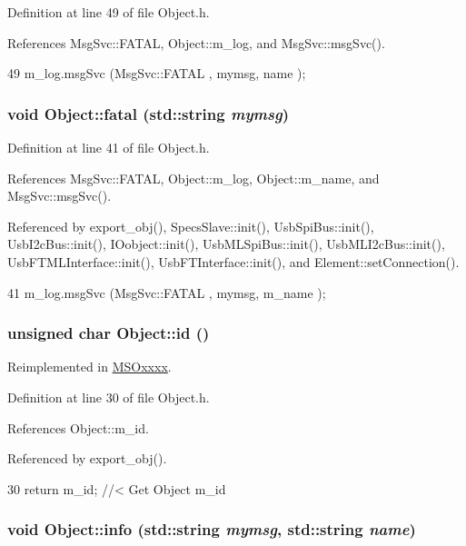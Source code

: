 Definition at line 49 of file Object.h.

References MsgSvc::FATAL, Object::m\_\-log, and MsgSvc::msgSvc().


\begin{DoxyCode}
49 { m_log.msgSvc (MsgSvc::FATAL   , mymsg, name ); }
\end{DoxyCode}
\hypertarget{classObject_aad5a16aac7516ce65bd5ec02ab07fc80}{
\subsubsection[{fatal}]{\setlength{\rightskip}{0pt plus 5cm}void Object::fatal (std::string {\em mymsg})}}
\label{classObject_aad5a16aac7516ce65bd5ec02ab07fc80}


Definition at line 41 of file Object.h.

References MsgSvc::FATAL, Object::m\_\-log, Object::m\_\-name, and MsgSvc::msgSvc().

Referenced by export\_\-obj(), SpecsSlave::init(), UsbSpiBus::init(), UsbI2cBus::init(), IOobject::init(), UsbMLSpiBus::init(), UsbMLI2cBus::init(), UsbFTMLInterface::init(), UsbFTInterface::init(), and Element::setConnection().


\begin{DoxyCode}
41 { m_log.msgSvc (MsgSvc::FATAL   , mymsg, m_name ); }
\end{DoxyCode}
\hypertarget{classObject_af99145335cc61ff6e2798ea17db009d2}{
\subsubsection[{id}]{\setlength{\rightskip}{0pt plus 5cm}unsigned char Object::id ()}}
\label{classObject_af99145335cc61ff6e2798ea17db009d2}


Reimplemented in \hyperlink{classMSOxxxx_a0f14b23d31d8e7647184e99a89600cc3}{MSOxxxx}.

Definition at line 30 of file Object.h.

References Object::m\_\-id.

Referenced by export\_\-obj().


\begin{DoxyCode}
30 { return m_id;         } //< Get Object m_id 
\end{DoxyCode}
\hypertarget{classObject_a1ca123253dfd30fc28b156f521dcbdae}{
\subsubsection[{info}]{\setlength{\rightskip}{0pt plus 5cm}void Object::info (std::string {\em mymsg}, \/  std::string {\em name})}}
\label{classObject_a1ca123253dfd30fc28b156f521dcbdae}


